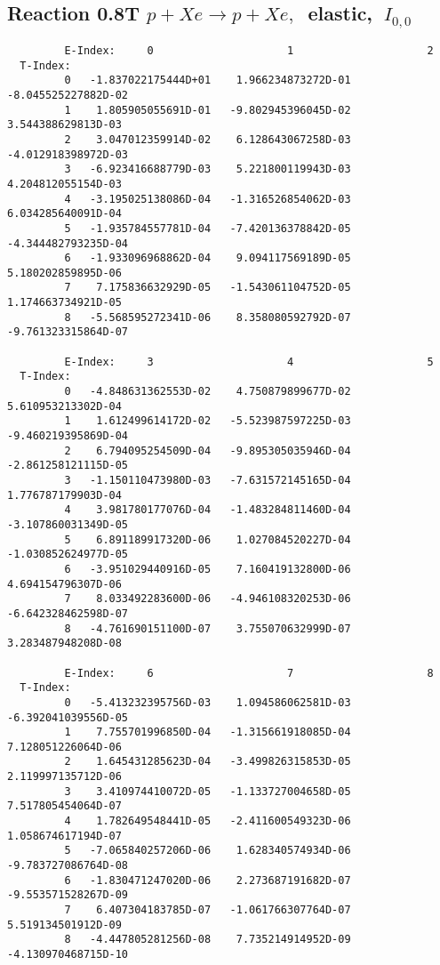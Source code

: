 \documentclass[12pt,dvipdfmx]{article}
\begin{document}
\subsection{
Reaction 0.8T  $p + Xe \rightarrow p + Xe ,\ $
 elastic, $\  I_{0,0}$
}

\begin{small}\begin{verbatim}
         E-Index:     0                     1                     2
  T-Index:
         0   -1.837022175444D+01    1.966234873272D-01   -8.045525227882D-02
         1    1.805905055691D-01   -9.802945396045D-02    3.544388629813D-03
         2    3.047012359914D-02    6.128643067258D-03   -4.012918398972D-03
         3   -6.923416688779D-03    5.221800119943D-03    4.204812055154D-03
         4   -3.195025138086D-04   -1.316526854062D-03    6.034285640091D-04
         5   -1.935784557781D-04   -7.420136378842D-05   -4.344482793235D-04
         6   -1.933096968862D-04    9.094117569189D-05    5.180202859895D-06
         7    7.175836632929D-05   -1.543061104752D-05    1.174663734921D-05
         8   -5.568595272341D-06    8.358080592792D-07   -9.761323315864D-07

         E-Index:     3                     4                     5
  T-Index:
         0   -4.848631362553D-02    4.750879899677D-02    5.610953213302D-04
         1    1.612499614172D-02   -5.523987597225D-03   -9.460219395869D-04
         2    6.794095254509D-04   -9.895305035946D-04   -2.861258121115D-05
         3   -1.150110473980D-03   -7.631572145165D-04    1.776787179903D-04
         4    3.981780177076D-04   -1.483284811460D-04   -3.107860031349D-05
         5    6.891189917320D-06    1.027084520227D-04   -1.030852624977D-05
         6   -3.951029440916D-05    7.160419132800D-06    4.694154796307D-06
         7    8.033492283600D-06   -4.946108320253D-06   -6.642328462598D-07
         8   -4.761690151100D-07    3.755070632999D-07    3.283487948208D-08

         E-Index:     6                     7                     8
  T-Index:
         0   -5.413232395756D-03    1.094586062581D-03   -6.392041039556D-05
         1    7.755701996850D-04   -1.315661918085D-04    7.128051226064D-06
         2    1.645431285623D-04   -3.499826315853D-05    2.119997135712D-06
         3    3.410974410072D-05   -1.133727004658D-05    7.517805454064D-07
         4    1.782649548441D-05   -2.411600549323D-06    1.058674617194D-07
         5   -7.065840257206D-06    1.628340574934D-06   -9.783727086764D-08
         6   -1.830471247020D-06    2.273687191682D-07   -9.553571528267D-09
         7    6.407304183785D-07   -1.061766307764D-07    5.519134501912D-09
         8   -4.447805281256D-08    7.735214914952D-09   -4.130970468715D-10
\end{verbatim}\end{small}
\end{document}
